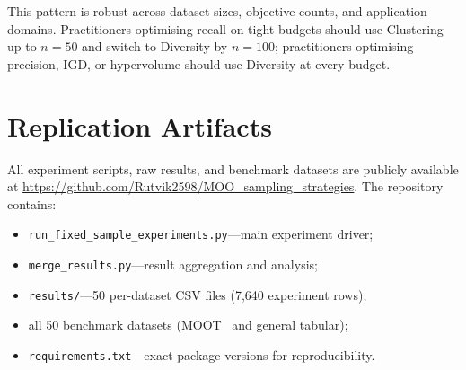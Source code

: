 \documentclass[sigconf,nonacm]{acmart}
\begin{document}
This pattern is robust across dataset sizes, objective counts, and
application domains.
Practitioners optimising recall on tight budgets should use Clustering up to
$n=50$ and switch to Diversity by $n=100$; practitioners optimising
precision, IGD, or hypervolume should use Diversity at every budget.

\section*{Replication Artifacts}
\label{sec:artifacts}

All experiment scripts, raw results, and benchmark datasets are publicly
available at \url{https://github.com/Rutvik2598/MOO_sampling_strategies}.
The repository contains:
\begin{itemize}[leftmargin=*]
  \item \texttt{run\_fixed\_sample\_experiments.py}---main experiment driver;
  \item \texttt{merge\_results.py}---result aggregation and analysis;
  \item \texttt{results/}---50 per-dataset CSV files (7,640 experiment rows);
  \item all 50 benchmark datasets (MOOT~\cite{moot2025} and general tabular);
  \item \texttt{requirements.txt}---exact package versions for reproducibility.
\end{itemize}



\end{document}
